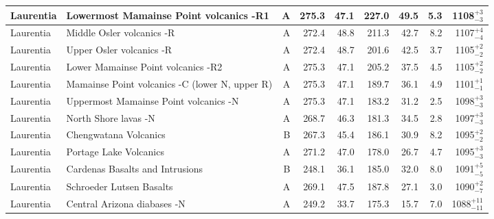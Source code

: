 \begin{longtable}{p{1 in}p{1 in}rrrrrrr}
                     Laurentia &             Lowermost Mamainse Point volcanics -R1 &      A &     275.3 &      47.1 & 227.0 &  49.5 &       5.3 &     1108$^{+3}_{-3}$ \\ \hline
                     Laurentia &                          Middle Osler volcanics -R &      A &     272.4 &      48.8 & 211.3 &  42.7 &       8.2 &     1107$^{+4}_{-4}$ \\ \hline
                     Laurentia &                           Upper Osler volcanics -R &      A &     272.4 &      48.7 & 201.6 &  42.5 &       3.7 &     1105$^{+2}_{-2}$ \\ \hline
                     Laurentia &                 Lower Mamainse Point volcanics -R2 &      A &     275.3 &      47.1 & 205.2 &  37.5 &       4.5 &     1105$^{+2}_{-2}$ \\ \hline
                     Laurentia &     Mamainse Point volcanics -C (lower N, upper R) &      A &     275.3 &      47.1 & 189.7 &  36.1 &       4.9 &     1101$^{+1}_{-1}$ \\ \hline
                     Laurentia &              Uppermost Mamainse Point volcanics -N &      A &     275.3 &      47.1 & 183.2 &  31.2 &       2.5 &     1098$^{+3}_{-3}$ \\ \hline
                     Laurentia &                               North Shore lavas -N &      A &     268.7 &      46.3 & 181.3 &  34.5 &       2.8 &     1097$^{+3}_{-3}$ \\ \hline
                     Laurentia &                              Chengwatana Volcanics &      B &     267.3 &      45.4 & 186.1 &  30.9 &       8.2 &     1095$^{+2}_{-2}$ \\ \hline
                     Laurentia &                             Portage Lake Volcanics &      A &     271.2 &      47.0 & 178.0 &  26.7 &       4.7 &     1095$^{+3}_{-3}$ \\ \hline
                     Laurentia &                    Cardenas Basalts and Intrusions &      B &     248.1 &      36.1 & 185.0 &  32.0 &       8.0 &     1091$^{+5}_{-5}$ \\ \hline
                     Laurentia &                           Schroeder Lutsen Basalts &      A &     269.1 &      47.5 & 187.8 &  27.1 &       3.0 &     1090$^{+2}_{-7}$ \\ \hline
                     Laurentia &                        Central Arizona diabases -N &      A &     249.2 &      33.7 & 175.3 &  15.7 &       7.0 &   1088$^{+11}_{-11}$ \\ \hline

\end{longtable}
